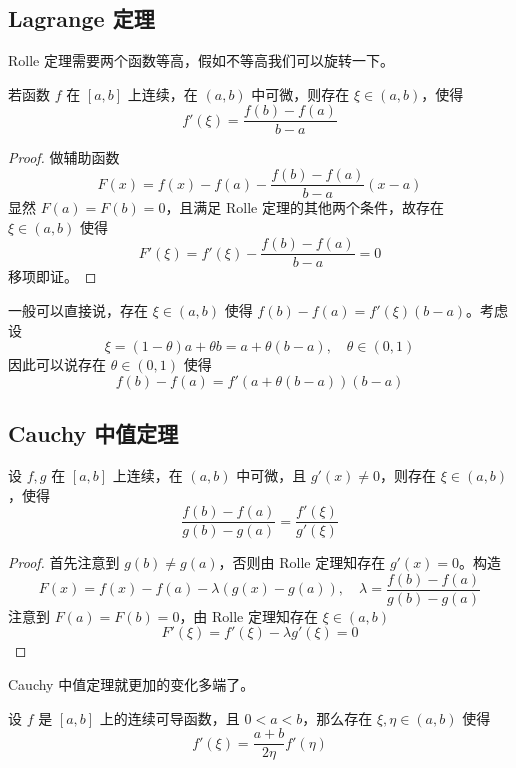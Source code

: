 \subsection{Lagrange 定理}

Rolle 定理需要两个函数等高，假如不等高我们可以旋转一下。

\begin{theorem}[Lagrange 定理]
	若函数 $f$ 在 $[a,b]$ 上连续，在 $(a,b)$ 中可微，则存在 $\xi\in(a,b)$，使得
	\[ f'(\xi)=\frac{f(b)-f(a)}{b-a} \]
\end{theorem}

\begin{proof}
	做辅助函数
	\[ F(x) = f(x) - f(a) - \frac{f(b) - f(a)}{b - a}(x - a) \]
	显然 $F(a) = F(b) = 0$，且满足 Rolle 定理的其他两个条件，故存在 $\xi \in (a, b)$ 使得
	\[ F'(\xi) = f'(\xi) - \frac{f(b) - f(a)}{b - a} = 0 \]
	移项即证。
\end{proof}

一般可以直接说，存在 $\xi \in (a, b)$ 使得 $f(b) - f(a) = f'(\xi)(b-a)$。考虑设
\[ \xi = (1-\theta)a + \theta b = a + \theta(b-a), \quad \theta \in (0, 1) \]
因此可以说存在 $\theta \in (0, 1)$ 使得
\[ f(b) - f(a) = f'(a + \theta(b-a)) (b-a) \]

\subsection{Cauchy 中值定理}

\begin{theorem}
	设 $f,g$ 在 $[a,b]$ 上连续，在 $(a,b)$ 中可微，且 $g'(x)\ne 0$，则存在 $\xi\in (a,b)$，使得
	\[ \frac{f(b)-f(a)}{g(b)-g(a)} = \frac{f'(\xi)}{g'(\xi)} \]
\end{theorem}

\begin{proof}
	首先注意到 $g(b) \neq g(a)$，否则由 Rolle 定理知存在 $g'(x) = 0$。构造
	\[ F(x) = f(x) - f(a) - \lambda (g(x) - g(a)) , \quad \lambda = \frac{f(b) - f(a)}{g(b) - g(a)} \]
	注意到 $F(a) = F(b) = 0$，由 Rolle 定理知存在 $\xi \in (a, b)$
	\[ F'(\xi) = f'(\xi) - \lambda g'(\xi) = 0 \]
\end{proof}

Cauchy 中值定理就更加的变化多端了。

\begin{proposition}
	设 $f$ 是 $[a,b]$ 上的连续可导函数，且 $0 < a < b$，那么存在 $\xi, \eta \in (a,b)$ 使得
	\[ f'(\xi) = \frac{a+b}{2\eta}f'(\eta) \]
\end{proposition}


